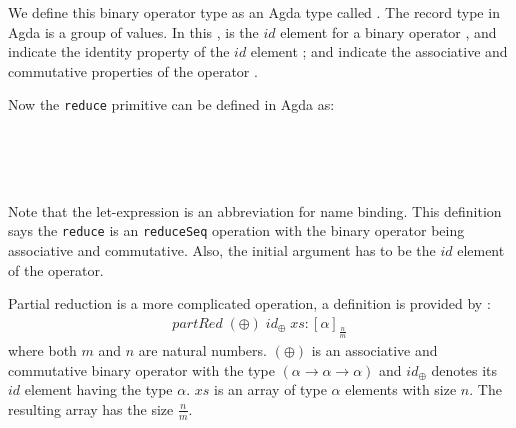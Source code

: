 \documentclass{l4proj}
\begin{document}
We define this binary operator type as an Agda  type called . The record type in Agda is a group of values. In this ,  is the $id$ element for a binary operator ,  and  indicate the identity property of the $id$ element ;  and  indicate the associative and commutative properties of the operator .

Now the \texttt{reduce} primitive can be defined in Agda as:
\begin{code}%
\>[0]\<%
\\
\>[0]\AgdaSpace{}%
\AgdaSymbol{:}\AgdaSpace{}%
\AgdaSymbol{\{}\AgdaSpace{}%
\AgdaSymbol{:}\AgdaSpace{}%
\AgdaSymbol{\}}\AgdaSpace{}%
\AgdaSpace{}%
\AgdaSymbol{\{}\AgdaSpace{}%
\AgdaSymbol{:}\AgdaSpace{}%
\AgdaSymbol{\}}\AgdaSpace{}%
\AgdaSpace{}%
\AgdaSymbol{(}\AgdaSpace{}%
\AgdaSymbol{:}\AgdaSpace{}%
\AgdaSpace{}%
\AgdaSymbol{)}\AgdaSpace{}%
\AgdaSpace{}%
\AgdaSpace{}%
\AgdaSpace{}%
\AgdaSpace{}%
\AgdaSpace{}%
\<%
\\
\>[0]\AgdaSpace{}%
\AgdaSpace{}%
\AgdaSpace{}%
\AgdaSymbol{=}%
\>[482I]\AgdaSpace{}%
\AgdaSpace{}%
\AgdaSymbol{=}\AgdaSpace{}%
\AgdaSpace{}%
\AgdaSymbol{;}\AgdaSpace{}%
\AgdaSpace{}%
\AgdaSymbol{=}\AgdaSpace{}%
\AgdaSpace{}%
\<%
\\
\>[.][@{}l@{}]\<[482I]%
\>[14]\AgdaSpace{}%
\AgdaSpace{}%
\AgdaSpace{}%
\AgdaSpace{}%
\<%
\end{code}
Note that the let-expression is an abbreviation for name binding. This definition says the \texttt{reduce} is an \texttt{reduceSeq} operation with the binary operator being associative and commutative. Also, the initial argument has to be the $id$ element of the operator.

Partial reduction is a more complicated operation, a definition is provided by \cite{steuwer2015improving}:
\begin{align}
    partRed \;(\oplus)\; id_\oplus\; xs : [\alpha]_{\frac{n}{m}}
\end{align}
where both $m$ and $n$ are natural numbers. $(\oplus)$ is an associative and commutative binary operator with the type $(\alpha \to \alpha \to \alpha)$ and $id_\oplus$ denotes its $id$ element having the type $\alpha$. $xs$ is an array of type $\alpha$ elements with size $n$. The resulting array has the size $\frac{n}{m}$.
\end{document}
